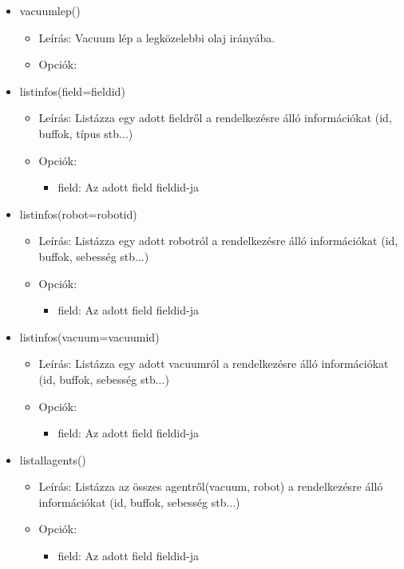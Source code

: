 \begin{itemize}
     \item vacuumlep()
     \begin{itemize}
        	\item Leírás: Vacuum lép a legközelebbi olaj irányába.
        	\item Opciók: 
     \end{itemize}    
     
    \item listinfos(field=fieldid)
    \begin{itemize}
    	\item Leírás: Listázza egy adott fieldről a rendelkezésre álló információkat (id, buffok, típus stb...)
    	\item Opciók: 
    	\begin{itemize}
    		\item field: Az adott field fieldid-ja
    	\end{itemize}	
    \end{itemize}      
         
    \item listinfos(robot=robotid)
    \begin{itemize}
    	\item Leírás: Listázza egy adott robotról a rendelkezésre álló információkat (id, buffok, sebesség stb...)
    	\item Opciók: 
    	\begin{itemize}
    		\item field: Az adott field fieldid-ja
    	\end{itemize}	
    \end{itemize} 
    
    \item listinfos(vacuum=vacuumid)
    \begin{itemize}
    	\item Leírás: Listázza egy adott vacuumról a rendelkezésre álló információkat (id, buffok, sebesség stb...)
    	\item Opciók: 
    	\begin{itemize}
    		\item field: Az adott field fieldid-ja
    	\end{itemize}	
    \end{itemize}     
    
    \item listallagents()
    \begin{itemize}
    	\item Leírás: Listázza az összes agentről(vacuum, robot) a rendelkezésre álló információkat (id, buffok, sebesség stb...)
    	\item Opciók: 
    	\begin{itemize}
    		\item field: Az adott field fieldid-ja
    	\end{itemize}	
    \end{itemize}    
    

\end{itemize}
